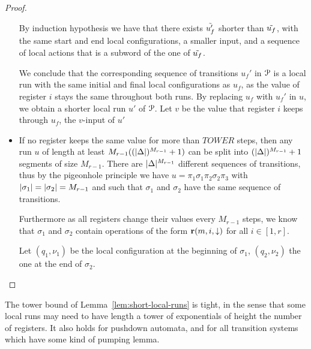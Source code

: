 \begin{proof}
\begin{itemize}
		By induction hypothesis we have that there exists $\Tilde{u'_f}$ shorter than $\Tilde{u_f}$, with the same start and end local configurations, a smaller input, and a sequence of local actions that is a subword of the one of $\Tilde{u_f}$.
		
		We conclude that the corresponding sequence of transitions $u_f'$ in $\mathcal{P}$ is a local run with the same initial and final local configurations as $u_f$, as the value of register $i$ stays the same throughout both runs. By replacing $u_f$ with $u_f'$ in $u$, we obtain a shorter local run $u'$ of $\mathcal{P}$. Let $v$ be the value that register $i$ keeps through $u_f$, the $v$-input of $u'$ 
		
		\item If no register keeps the same value for more than $TOWER$ steps, then any run $u$ of length at least $M_{r-1} ((|\Delta|)^{M_{r-1}} +1)$ can be split into $(|\Delta|)^{M_{r-1}} +1$ segments of size $M_{r-1}$. There are $|\Delta|^{M_{r-1}}$ different sequences of transitions, thus by the pigeonhole principle we have $u = \pi_1 \sigma_1 \pi_2 \sigma_2 \pi_3$ with $|\sigma_1| = |\sigma_2| = M_{r-1}$ and such that  $\sigma_1$ and $\sigma_2$ have the same sequence of transitions.
		
		Furthermore as all registers change their values every $M_{r-1}$ steps, we know that $\sigma_1$ and $\sigma_2$ contain operations of the form $\textbf{r}(m, i, \downarrow)$ for all $i \in [1,r]$.
		
		Let $(q_1, \nu_1)$ be the local configuration at the beginning of $\sigma_1$, $(q_2, \nu_2)$ the one at the end of $\sigma_2$.
	\end{itemize}
	
\end{proof}
\fi 

\begin{remark}
	The tower bound of Lemma~\ref{lem:short-local-runs} is tight, in the sense that some local runs may need to have length a tower of exponentials of height the number of registers.
	It also holds for pushdown automata, and for all transition systems which have some kind of pumping lemma.
\end{remark}

